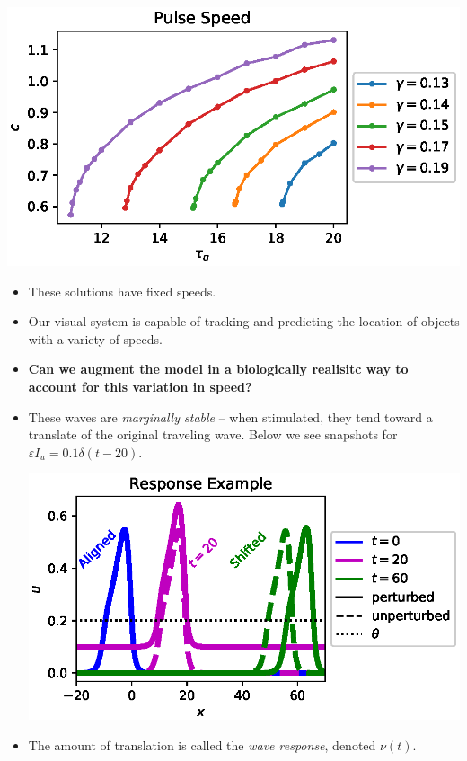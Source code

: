 \documentclass[landscape,final]{baposter}
\begin{document}
\begin{poster}
{\begin{center}
		\includegraphics[width=.9\linewidth, trim={0cm, 1cm, 0cm, .2cm}, clip=true]{pulse_speed}
	\end{center}
}


{
	\begin{itemize}
	\item These solutions have fixed speeds.
	\item Our visual system is capable of tracking and predicting the location of objects with a variety of speeds.
	\item \textbf{Can we augment the model in a biologically realisitc way to account for this variation in speed?}
	\item These waves are \textit{marginally stable} -- when stimulated, they tend toward a translate of the original traveling wave. Below we see snapshots for $\varepsilon I_u = 0.1 \delta(t - 20)$.
	\begin{center}
		\includegraphics[width=.9\linewidth]{response_example}
	\end{center}
	\item The amount of translation is called the \textit{wave response}, denoted $\nu(t)$.
	\end{itemize}
	\vspace{.2cm}
}


\end{poster}
\end{document}
